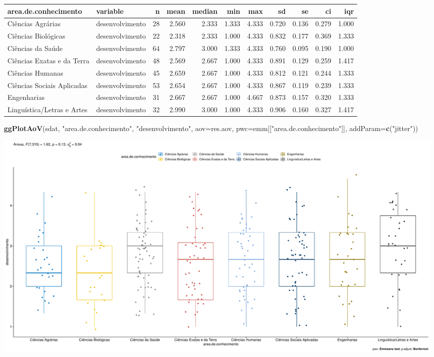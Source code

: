 \documentclass[]{article}
\newenvironment{Shaded}{\begin{snugshade}}{\end{snugshade}}
\newcommand{\DataTypeTok}[1]{\textcolor[rgb]{0.13,0.29,0.53}{#1}}
\newcommand{\KeywordTok}[1]{\textcolor[rgb]{0.13,0.29,0.53}{\textbf{#1}}}
\newcommand{\NormalTok}[1]{#1}
\newcommand{\StringTok}[1]{\textcolor[rgb]{0.31,0.60,0.02}{#1}}
\begin{document}
\begin{longtable}[]{@{}llrrrrrrrrr@{}}
\toprule
area.de.conhecimento & variable & n & mean & median & min & max & sd &
se & ci & iqr\tabularnewline
\midrule
\endhead
Ciências Agrárias & desenvolvimento & 28 & 2.560 & 2.333 & 1.333 & 4.333
& 0.720 & 0.136 & 0.279 & 1.000\tabularnewline
Ciências Biológicas & desenvolvimento & 22 & 2.318 & 2.333 & 1.000 &
4.333 & 0.832 & 0.177 & 0.369 & 1.333\tabularnewline
Ciências da Saúde & desenvolvimento & 64 & 2.797 & 3.000 & 1.333 & 4.333
& 0.760 & 0.095 & 0.190 & 1.000\tabularnewline
Ciências Exatas e da Terra & desenvolvimento & 48 & 2.569 & 2.667 &
1.000 & 4.333 & 0.891 & 0.129 & 0.259 & 1.417\tabularnewline
Ciências Humanas & desenvolvimento & 45 & 2.659 & 2.667 & 1.000 & 4.333
& 0.812 & 0.121 & 0.244 & 1.333\tabularnewline
Ciências Sociais Aplicadas & desenvolvimento & 53 & 2.654 & 2.667 &
1.000 & 4.333 & 0.867 & 0.119 & 0.239 & 1.333\tabularnewline
Engenharias & desenvolvimento & 31 & 2.667 & 2.667 & 1.000 & 4.667 &
0.873 & 0.157 & 0.320 & 1.333\tabularnewline
Linguística/Letras e Artes & desenvolvimento & 32 & 2.990 & 3.000 &
1.000 & 4.333 & 0.906 & 0.160 & 0.327 & 1.417\tabularnewline
\bottomrule
\end{longtable}

\begin{Shaded}
\begin{Highlighting}[]
\KeywordTok{ggPlotAoV}\NormalTok{(sdat, }\StringTok{"area.de.conhecimento"}\NormalTok{, }\StringTok{"desenvolvimento"}\NormalTok{, }\DataTypeTok{aov=}\NormalTok{res.aov, }\DataTypeTok{pwc=}\NormalTok{emm[[}\StringTok{"area.de.conhecimento"}\NormalTok{]], }\DataTypeTok{addParam=}\KeywordTok{c}\NormalTok{(}\StringTok{"jitter"}\NormalTok{))}
\end{Highlighting}
\end{Shaded}

\includegraphics{factorialAnova_files/figure-latex/unnamed-chunk-34-1.pdf}
\end{document}
